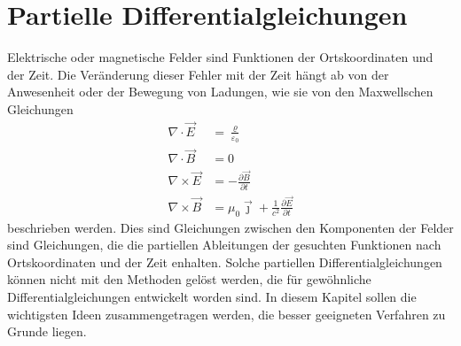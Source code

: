 %
%
%
\chapter{Partielle Differentialgleichungen\label{chapter:pde}}
\rhead{}
Elektrische oder magnetische Felder sind Funktionen der Ortskoordinaten
und der Zeit.
Die Veränderung dieser Fehler mit der Zeit hängt ab von der Anwesenheit
oder der Bewegung von Ladungen, wie sie von den Maxwellschen Gleichungen
\begin{align*}
\nabla\cdot\vec{E} &= \frac{\varrho}{\varepsilon_0}
\\
\nabla\cdot\vec{B} &= 0
\\
\nabla\times\vec{E} &= -\frac{\partial\vec{B}}{\partial t}
\\
\nabla\times\vec{B} &= \mu_0\vec{\jmath}
	+ \frac{1}{c^2}\frac{\partial\vec{E}}{\partial t}
\end{align*}
beschrieben werden.
Dies sind Gleichungen zwischen den Komponenten der Felder sind Gleichungen,
die die partiellen Ableitungen der gesuchten Funktionen nach Ortskoordinaten
und der Zeit enhalten.
Solche partiellen Differentialgleichungen können nicht mit den Methoden
gelöst werden, die für gewöhnliche Differentialgleichungen entwickelt 
worden sind.
In diesem Kapitel sollen die wichtigsten Ideen zusammengetragen werden,
die besser geeigneten Verfahren zu Grunde liegen.






